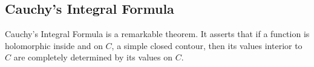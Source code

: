 \bigskip

\subsection{Cauchy's Integral Formula}

\begin{discussion}
Cauchy's Integral Formula is a remarkable theorem. It asserts that if a function is holomorphic inside and on $C$, a simple closed contour, then its values interior to $C$ are completely determined by its values on $C$. 
\end{discussion}

\medskip

